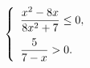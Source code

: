 \begin{ex}[type=ineq_system]
	\begin{condition}
		\( \left\{
		\begin{array}{l}
			\dfrac{x^2-8x}{8x^2+7}\le0,\vspace{2mm}\\
			\dfrac{5}{7-x}>0.
		\end{array}
		\right. \)
	\end{condition}
\end{ex}